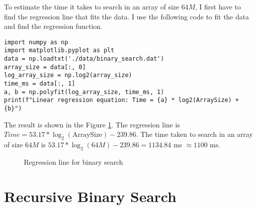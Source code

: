 \documentclass[a4paper,11pt]{article}
\begin{document}
To estimate the time it takes to search in an array of size $64M$, I first have to
find the regression line that fits the data. I use the following code to fit 
the data and find the regression function.

\begin{verbatim}
import numpy as np
import matplotlib.pyplot as plt
data = np.loadtxt('./data/binary_search.dat')
array_size = data[:, 0]
log_array_size = np.log2(array_size)
time_ms = data[:, 1]  
a, b = np.polyfit(log_array_size, time_ms, 1)
print(f"Linear regression equation: Time = {a} * log2(ArraySize) + {b}")
\end{verbatim}

The result is shown in the Figure \ref{fig:regression}. The regression line is
$Time = 53.17 * \log_{2}(\text{ArraySize}) - 239.86$. The time taken to search in an array of size $64M$ is
$53.17 * \log_{2}(64M) - 239.86 = 1134.84$ ms $\approx 1100 $ ms.

\begin{figure}[H]
  \centering
  \resizebox{\linewidth}{!}{
    
  }
  \caption{Regression line for binary search}
  \label{fig:regression}
\end{figure}

\section*{Recursive Binary Search}
\end{document}
